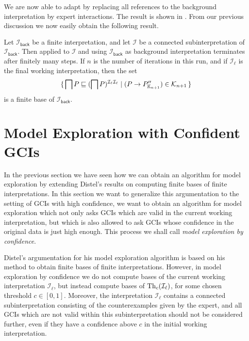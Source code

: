 We are now able to adapt  by replacing all references to
the background interpretation by expert interactions.  The result is shown in
.  From our previous discussion we now easily obtain the
following result.

\begin{Theorem}
  \label{thm:Felix-6.16}
  Let $\mathcal{I}_{\mathsf{back}}$ be a finite interpretation, and let $\mathcal{I}$ be a
  connected subinterpretation of $\mathcal{I}_{\mathsf{back}}$.  Then
   applied to $\mathcal{I}$ and using
  $\mathcal{I}_{\mathsf{back}}$ as background interpretation terminates after finitely
  many steps.  If $n$ is the number of iterations in this run, and if $\mathcal{I}_{\ell}$
  is the final working interpretation, then the set
  \begin{equation*}
    {\ensuremath{\{\, \bigsqcap P \sqsubseteq (\bigsqcap P)^{\mathcal{I}_{\ell}\mathcal{I}_{\ell}}
      \mid (P \to P_{{\mathbb{K}}_{n+1}}'') \in \mathcal{K}_{n+1} \,\}}}
  \end{equation*}
  is a finite base of $\mathcal{I}_{\mathsf{back}}$.
\end{Theorem}

\section{Model Exploration with Confident GCIs}
\label{sec:model-expl-with-1}

In the previous section we have seen how we can obtain an algorithm for model exploration
by extending Distel's results on computing finite bases of finite interpretations.  In
this section we want to generalize this argumentation to the setting of GCIs with high
confidence, \ie we want to obtain an algorithm for model exploration which not only asks
GCIs which are valid in the current working interpretation, but which is also allowed to
ask GCIs whose confidence in the original data is just high enough.  This process we shall
call \emph{model exploration by confidence}.

Distel's argumentation for his model exploration algorithm is based on his method to
obtain finite bases of finite interpretations.  However, in model exploration by
confidence we do not compute bases of the current working interpretation
$\mathcal{I}_{\ell}$, but instead compute bases of $\operatorname{Th}_{c}(\mathcal{I}_{\ell})$, for some
chosen threshold $c \in [0,1]$.  Moreover, the interpretation $\mathcal{I}_{\ell}$
contains a connected subinterpretation consisting of the counterexamples given by the
expert, and all GCIs which are not valid within this subinterpretation should not be
considered further, even if they have a confidence above $c$ in the initial working
interpretation.

